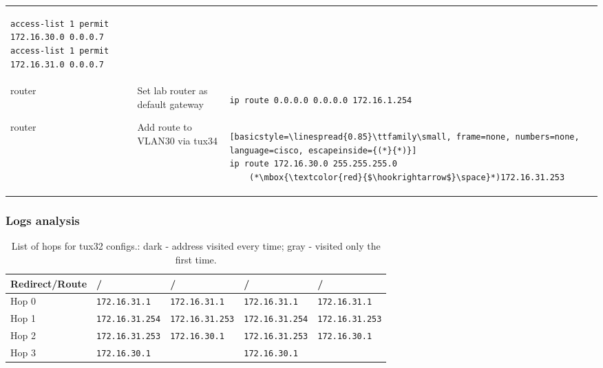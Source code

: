 \documentclass[a4paper, 11pt]{report}
\newcommand\greencheckmark{{\color{ForestGreen}\ding{52}}}
\newcommand\redcross{{\color{red}\ding{54}}}
\begin{document}
\begin{center}
\begin{longtable}{@{}l | m{77mm} | l@{}}
\begin{lstlisting}[basicstyle=\linespread{0.85}\ttfamily\small, frame=none, numbers=none, language=cisco]
access-list 1 permit 172.16.30.0 0.0.0.7
access-list 1 permit 172.16.31.0 0.0.0.7
        \end{lstlisting}\\
        router & Set lab router as default gateway & \begin{lstlisting}[basicstyle=\linespread{0.85}\ttfamily\small, frame=none, numbers=none, language=cisco]
ip route 0.0.0.0 0.0.0.0 172.16.1.254
        \end{lstlisting}\\
        router & Add route to VLAN30 via tux34 & \begin{lstlisting}[basicstyle=\linespread{0.85}\ttfamily\small, frame=none, numbers=none, language=cisco, escapeinside={(*}{*)}]
ip route 172.16.30.0 255.255.255.0
    (*\mbox{\textcolor{red}{$\hookrightarrow$}\space}*)172.16.31.253
        \end{lstlisting}
    \end{longtable}
\end{center}

\subsubsection{Logs analysis} \label{sec:Log4}

\begin{table}[h]
    \centering
    \small
    \begin{tabular}{@{}l | l | l | l | l@{}}
        {\normalfont\textbf{Redirect/Route}} & \redcross/\redcross    & \redcross/\greencheckmark & \greencheckmark/\redcross          & \greencheckmark/\greencheckmark \\ \hline
        Hop 0                                & \texttt{172.16.31.1  } & \texttt{172.16.31.1  }    & \texttt{172.16.31.1  }             & \texttt{172.16.31.1  }          \\
        Hop 1                                & \texttt{172.16.31.254} & \texttt{172.16.31.253}    & \texttt{\color{gray}172.16.31.254} & \texttt{172.16.31.253}          \\
        Hop 2                                & \texttt{172.16.31.253} & \texttt{172.16.30.1  }    & \texttt{172.16.31.253}             & \texttt{172.16.30.1  }          \\
        Hop 3                                & \texttt{172.16.30.1  } & \texttt{             }    & \texttt{172.16.30.1  }             & \texttt{             }          
    \end{tabular}
    \caption{List of hops for tux32 configs.: dark - address visited every time; gray - visited only the first time.}
    \label{fig:hops}
\end{table}
\end{document}
